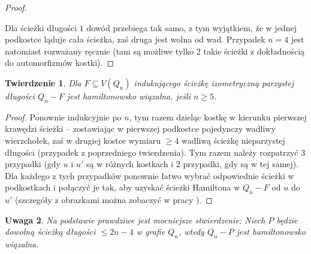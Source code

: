 \documentclass{pracamgr}
\newtheorem{theorem}{Twierdzenie}[chapter]
\newtheorem{remark}[theorem]{Uwaga}
\begin{document}
\begin{proof}
\begin{center}
     \end{center}
     Dla ścieżki długości $1$ dowód przebiega tak samo, z tym wyjątkiem, że w jednej podkostce ląduje cała ścieżka, zaś druga jest wolna od wad.
     Przypadek $n=4$ jest natomiast rozważany ręcznie
     (tam są możliwe tylko 2 takie ścieżki z dokładnością do automorfizmów kostki).
    \end{proof}
    \begin{theorem}\label{hamilton - sciezka, parz}
     Dla $F\subseteq V(Q_n)$ indukującego ścieżkę izometryczną parzystej długości $Q_n-F$ jest hamiltonowsko wiązalna, jeśli $n\ge5$.
    \end{theorem}
    \begin{proof}
     Ponownie indukcyjnie po $n$, tym razem dzieląc kostkę w kierunku pierwszej krawędzi ścieżki -- zostawiając w pierwszej podkostce pojedynczy wadliwy wierzchołek,
     zaś w drugiej kostce wymiaru $\ge4$ wadliwą ścieżkę nieparzystej długości (przypadek z poprzedniego twierdzenia).
     Tym razem należy rozpatrzyć 3 przypadki (gdy $u$ i $u'$ są w różnych kostkach i 2 przypadki, gdy są w tej samej).
     Dla każdego z tych przypadków ponownie łatwo wybrać odpowiednie ścieżki w podkostkach i połączyć je tak, aby uzyskać ścieżki Hamiltona w
     $Q_n-F$ od $u$ do $u'$ (szczegóły z obrazkami można zobaczyć w pracy \cite{Pegr}).
    \end{proof}
    \begin{remark}
     Na podstawie \cite{SCJY} prawdziwe jest mocniejsze stwierdzenie:\newline
     Niech $P$ będzie dowolną ścieżką długości $\le 2n-4$ w grafie $Q_n$, wtedy $Q_n-P$ jest hamiltonowsko wiązalna.
    \end{remark}
\end{document}
